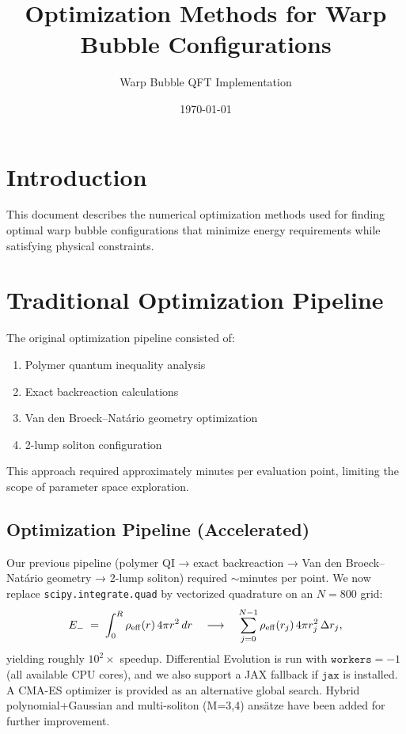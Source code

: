 \documentclass[12pt]{article}
\title{Optimization Methods for Warp Bubble Configurations}
\author{Warp Bubble QFT Implementation}
\date{\today}
\begin{document}
\maketitle

\section{Introduction}

This document describes the numerical optimization methods used for finding optimal warp bubble configurations that minimize energy requirements while satisfying physical constraints.

\section{Traditional Optimization Pipeline}

The original optimization pipeline consisted of:
\begin{enumerate}
\item Polymer quantum inequality analysis
\item Exact backreaction calculations
\item Van den Broeck–Natário geometry optimization
\item 2-lump soliton configuration
\end{enumerate}

This approach required approximately minutes per evaluation point, limiting the scope of parameter space exploration.

\subsection{Optimization Pipeline (Accelerated)}

Our previous pipeline (polymer QI → exact backreaction → Van den Broeck–Natário geometry → 2-lump soliton) required \(\sim\)minutes per point. We now replace \texttt{scipy.integrate.quad} by vectorized quadrature on an \(N=800\) grid:
\[
  E_{-} \;=\; \int_0^R \rho_{\rm eff}(r)\,4\pi r^2 \,dr 
  \quad\longrightarrow\quad
  \sum_{j=0}^{N-1} \rho_{\rm eff}(r_j)\,4\pi r_j^2\,\Delta r_j,
\]
yielding roughly \(10^2\times\) speedup. Differential Evolution is run with \(\texttt{workers}=-1\) (all available CPU cores), and we also support a JAX fallback if \(\texttt{jax}\) is installed. A CMA-ES optimizer is provided as an alternative global search. Hybrid polynomial+Gaussian and multi-soliton (M=3,4) ansätze have been added for further improvement.
\end{document}
